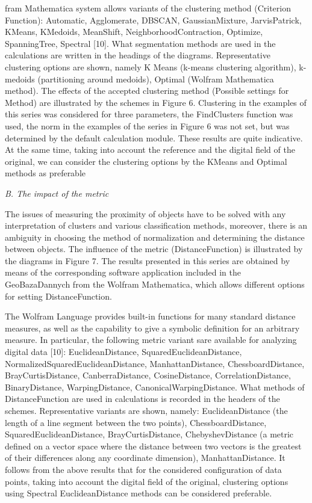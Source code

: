 \documentclass [10pt, letterpaper]{article}
\begin{document}
\begin{multicols}{2}

fram Mathematica system allows variants of the clustering method (Criterion Function): Automatic, Agglomerate, DBSCAN, GaussianMixture, JarvisPatrick, KMeans, KMedoids, MeanShift, NeighborhoodContraction, Optimize, SpanningTree, Spectral [10]. What segmentation methods are used in the calculations are written in the headings of the diagrams. Representative clustering options are shown, namely K Means (k-means clustering algorithm), k-medoids (partitioning around medoids), Optimal (Wolfram Mathematica method). The effects of the accepted clustering method (Possible settings for Method) are illustrated by the schemes in Figure 6. Clustering in the examples of this series was considered for three parameters, the FindClusters function was used, the norm in the examples of the series in Figure 6 was not set, but was determined by the default calculation module. These results are quite indicative. At the same time, taking into account the reference and the digital field of the original, we can consider the clustering options by the KMeans and Optimal methods as preferable 
\par{\textit{B. The impact of the metric}} \par{The issues of measuring the proximity of objects have to be solved with any interpretation of clusters and various classification methods, moreover, there is an ambiguity in choosing the method of normalization and determining the distance between objects. The influence of the metric (DistanceFunction) is illustrated by the diagrams in Figure 7. The results presented in this series are obtained by means of the corresponding software application included in the GeoBazaDannych from the Wolfram Mathematica, which allows different options for setting DistanceFunction.}\par {The Wolfram Language provides built-in functions for many standard distance measures, as well as the capability to give a symbolic definition for an arbitrary measure. In particular, the following metric variant sare available for analyzing digital data [10]: EuclideanDistance, SquaredEuclideanDistance, NormalizedSquaredEuclideanDistance, ManhattanDistance, ChessboardDistance, BrayCurtisDistance, CanberraDistance, CosineDistance, CorrelationDistance, BinaryDistance, WarpingDistance, CanonicalWarpingDistance. What methods of DistanceFunction are used in calculations is recorded in the headers of the schemes. Representative variants are shown, namely: EuclideanDistance (the length of a line segment between the two points), ChessboardDistance, SquaredEuclideanDistance, BrayCurtisDistance, ChebyshevDistance (a metric defined on a vector space where the distance between two vectors is the greatest of their differences along any coordinate dimension), ManhattanDistance. It follows from the above results that for the considered configuration of data points, taking into account the digital field of the original, clustering options using Spectral EuclideanDistance methods can be considered
preferable.} 


\end{multicols}
\end{document}

